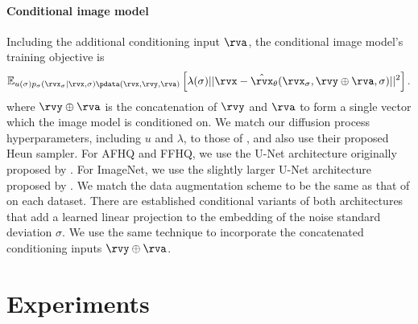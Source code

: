 \paragraph{Conditional image model}
Including the additional conditioning input $\rva$, the conditional image model's training objective is
\begin{equation}
\label{eq:conditional-image-model-objective}
    \mathbb{E}_{u(\sigma)p_\sigma(\rvx_\sigma|\rvx,\sigma)\pdata(\rvx,\rvy,\rva)} \left[ \lambda(\sigma) \lvert\lvert \rvx - \hat{\rvx}_\theta(\rvx_\sigma, \rvy \oplus \rva, \sigma) \rvert\rvert^2 \right].
\end{equation}
where $\rvy \oplus \rva$ is the concatenation of $\rvy$ and $\rva$ to form a single vector which the image model is conditioned on. We match our diffusion process hyperparameters, including $u$ and $\lambda$, to those of \citet{karras2022elucidating}, and also use their proposed Heun sampler.  For AFHQ and FFHQ, we use the U-Net architecture originally proposed by \citet{song2020score}. For ImageNet, we use the slightly larger U-Net architecture proposed by \citet{dhariwal2021diffusion}. We match the data augmentation scheme to be the same as that of \citet{karras2022elucidating} on each dataset. There are established conditional variants of both architectures~\citep{dhariwal2021diffusion,karras2022elucidating} that add a learned linear projection to the embedding of the noise standard deviation $\sigma$.  We use the same technique to incorporate the concatenated conditioning inputs $\rvy\oplus\rva$.



\section{Experiments} \label{sec:experiments}


